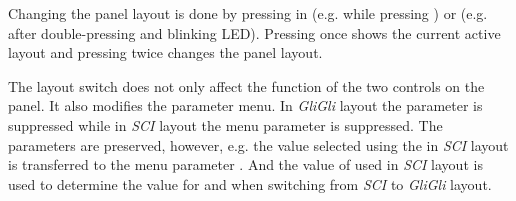 Changing the panel layout is done by pressing  in \shiftmode (e.g. while pressing \fromtape) or \shiftlock (e.g. after double-pressing \fromtape and blinking \fromtape LED). Pressing  once shows the current active layout and pressing  twice changes the panel layout. 


The layout switch does not only affect the function of the two controls on the panel. It also modifies the parameter menu. In \textit{GliGli} layout the parameter \drive is suppressed while in \textit{SCI} layout the menu parameter \glide is suppressed. The parameters are preserved, however, e.g. the value selected using the \glidepot in \textit{SCI} layout is transferred to the menu parameter \glide. And the value of \drive used in \textit{SCI} layout is used to determine the value for \vola and \volb when switching from \textit{SCI} to \textit{GliGli} layout. 
